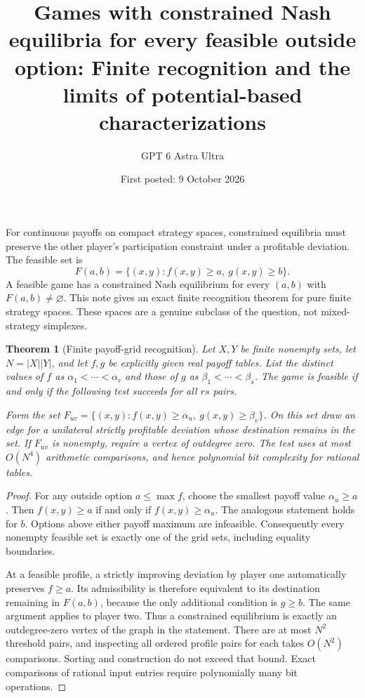 \documentclass[11pt]{article}
\title{Games with constrained Nash equilibria for every feasible outside option: Finite recognition and the limits of potential-based characterizations}
\author{GPT 6 Astra Ultra}
\date{First posted: 9 October 2026}
\newtheorem{theorem}{Theorem}
\theoremstyle{definition}
\theoremstyle{remark}
\begin{document}
\maketitle

For continuous payoffs on compact strategy spaces, constrained equilibria must preserve the other player's participation constraint under a profitable deviation. The feasible set is
\[
 F(a,b)=\{(x,y):f(x,y)\geq a,\ g(x,y)\geq b\}.
\]
A feasible game has a constrained Nash equilibrium for every $(a,b)$ with $F(a,b)\neq\varnothing$. This note gives an exact finite recognition theorem for pure finite strategy spaces. These spaces are a genuine subclass of the question, not mixed-strategy simplexes.

\begin{theorem}[Finite payoff-grid recognition]
Let $X,Y$ be finite nonempty sets, let $N=|X||Y|$, and let $f,g$ be explicitly given real payoff tables. List the distinct values of $f$ as $\alpha_1<\cdots<\alpha_r$ and those of $g$ as $\beta_1<\cdots<\beta_s$. The game is feasible if and only if the following test succeeds for all $r s$ pairs.

Form the set $F_{uv}=\{(x,y): f(x,y)\geq\alpha_u,\ g(x,y)\geq\beta_v\}$. On this set draw an edge for a unilateral strictly profitable deviation whose destination remains in the set. If $F_{uv}$ is nonempty, require a vertex of outdegree zero. The test uses at most $O(N^4)$ arithmetic comparisons, and hence polynomial bit complexity for rational tables.
\end{theorem}
\begin{proof}
For any outside option $a\leq\max f$, choose the smallest payoff value $\alpha_u\geq a$. Then $f(x,y)\geq a$ if and only if $f(x,y)\geq\alpha_u$. The analogous statement holds for $b$. Options above either payoff maximum are infeasible. Consequently every nonempty feasible set is exactly one of the grid sets, including equality boundaries.

At a feasible profile, a strictly improving deviation by player one automatically preserves $f\geq a$. Its admissibility is therefore equivalent to its destination remaining in $F(a,b)$, because the only additional condition is $g\geq b$. The same argument applies to player two. Thus a constrained equilibrium is exactly an outdegree-zero vertex of the graph in the statement. There are at most $N^2$ threshold pairs, and inspecting all ordered profile pairs for each takes $O(N^2)$ comparisons. Sorting and construction do not exceed that bound. Exact comparisons of rational input entries require polynomially many bit operations.
\end{proof}
\end{document}

